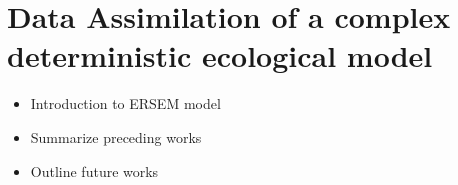 

\chapter{Data Assimilation of a complex deterministic ecological model}
\label{chapter4}

	\begin{itemize}
		\item Introduction to ERSEM model
		\item Summarize preceding works
		\item Outline future works
	\end{itemize}